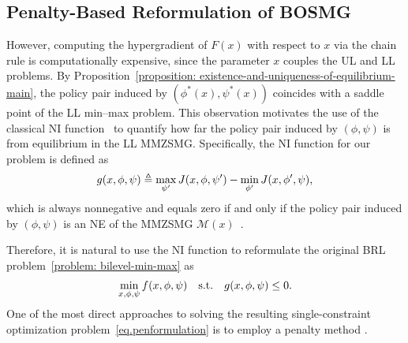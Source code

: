 \documentclass{article}
\theoremstyle{plain}
\theoremstyle{definition}
\theoremstyle{remark}
\newcommand{\st}{{\mathrm{s.t.}}}
\def\cM{\mathcal M}
\def\bydef{\triangleq}
\begin{document}
\subsection{Penalty-Based Reformulation of BOSMG}
However, computing the hypergradient of $F(x)$ with respect to $x$ via the chain rule is computationally expensive, since the parameter $x$ couples the UL and LL problems. 
By Proposition~\ref{proposition: existence-and-uniqueness-of-equilibrium-main},
the policy pair induced by $(\phi^*(x),\psi^*(x))$ coincides with a saddle
point of the LL min--max problem. This observation motivates the use of the classical NI function~\citep{nikaido1955note} to quantify how far the policy pair induced by $(\phi,\psi)$ is from
equilibrium in the LL MMZSMG. Specifically, the NI function for our problem is defined as
\vspace{-1mm}
\begin{align}
    g(x,\phi,\psi) \bydef  \max_{\psi^\prime } J(x,\phi,\psi^\prime) - \min_{\phi^\prime } J(x,\phi^\prime,\psi), \label{eq: ni-gap-function}
    \vspace{-3mm}
\end{align}
which is always nonnegative and equals zero if and only if the policy pair
induced by $(\phi,\psi)$ is an NE of the MMZSMG $\cM(x)$~\citep{von2009optimization}.

Therefore, it is natural to use the NI function to reformulate the original BRL problem~\eqref{problem: bilevel-min-max} as
\vspace{-1mm}
\begin{align}\label{eq.penformulation}
    \min_{x,\phi,\psi}   f(x,\phi,\psi) \quad 
    \st  \quad g(x,\phi,\psi) \leq 0.
    \vspace{-2mm}
\end{align}
One of the most direct approaches to solving the resulting single-constraint
optimization problem~\eqref{eq.penformulation} is to employ a penalty method
\citep{wright1999numerical,kwon2023penalty,chen2025near}.
\end{document}
